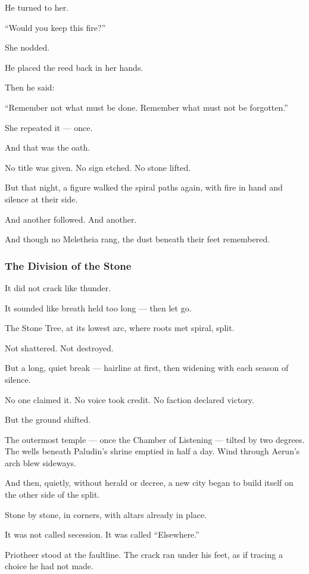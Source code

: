 \documentclass[12pt]{article}
\begin{document}
He turned to her.

 “Would you keep this fire?”

She nodded.

He placed the reed back in her hands.

Then he said:

 “Remember not what must be done.  
 Remember what must not be forgotten.”

She repeated it — once.

And that was the oath.

No title was given.  
No sign etched.  
No stone lifted.

But that night, a figure walked the spiral paths again,  
with fire in hand  
and silence at their side.

And another followed.  
And another.

And though no Meletheia rang,  
the dust beneath their feet remembered.

\dotfill

\subsubsection*{The Division of the Stone}


It did not crack like thunder.

It sounded like breath held too long —  
then let go.

The Stone Tree, at its lowest arc,  
where roots met spiral,  
split.

Not shattered. Not destroyed.

But a long, quiet break —  
hairline at first,  
then widening with each season of silence.

No one claimed it.  
No voice took credit.  
No faction declared victory.

But the ground shifted.

The outermost temple — once the Chamber of Listening — tilted by two degrees.  
The wells beneath Paludin’s shrine emptied in half a day.  
Wind through Aerun’s arch blew sideways.

And then, quietly, without herald or decree,  
a new city began to build itself on the other side of the split.

Stone by stone,  
in corners,  
with altars already in place.

It was not called secession.  
It was called “Elsewhere.”

Priotheer stood at the faultline.  
The crack ran under his feet,  
as if tracing a choice he had not made.
\end{document}
